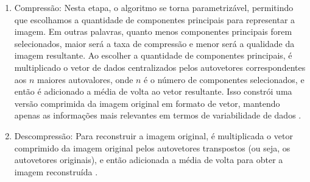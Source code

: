 \begin{enumerate}
    \item Compressão:
    Nesta etapa, o algoritmo se torna parametrizável, permitindo que escolhamos a quantidade de componentes principais para representar a imagem. Em outras palavras, quanto menos componentes principais forem selecionados, maior será a taxa de compressão e menor será a qualidade da imagem resultante. Ao escolher a quantidade de componentes principais, é multiplicado o  vetor de dados centralizados pelos autovetores correspondentes aos $n$ maiores autovalores, onde $n$ é o número de componentes selecionados, e então é adicionado a média de volta ao vetor resultante. Isso constrói uma versão comprimida da imagem original em formato de vetor, mantendo apenas as informações mais relevantes em termos de  variabilidade de dados \cite{multivariateAnalysis}.

    \item Descompressão:
    Para reconstruir a imagem original, é multiplicada o vetor comprimido da imagem original pelos autovetores transpostos (ou seja, os autovetores originais), e então adicionada a média de volta para obter a imagem reconstruída \cite{multivariateAnalysis}.
    
\end{enumerate}